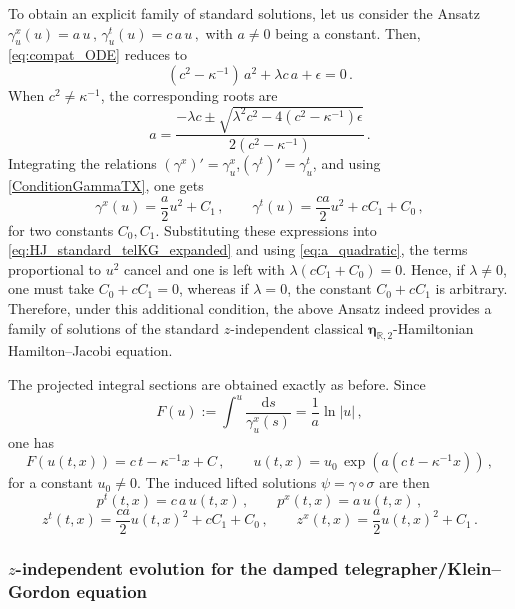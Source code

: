 \documentclass[11pt,twoside]{article}
\theoremstyle{plain}
\theoremstyle{definition}
\theoremstyle{remark}
\renewcommand{\d}{\mathrm{d}}
\begin{document}
To obtain an explicit family of standard solutions, let us consider the Ansatz
\(
\gamma_u^x(u)=a\,u\,,\, \gamma_u^t(u)=c\,a\,u\,,
\)
with \(a\neq0\) being a constant. Then, \eqref{eq:compat_ODE} reduces to
\begin{equation}\label{eq:a_quadratic}
(c^2-\kappa^{-1})\,a^2+\lambda c\,a+\epsilon=0\,.
\end{equation}
When \(c^2\neq \kappa^{-1}\), the corresponding roots are
\[
a=\frac{-\lambda c\pm\sqrt{\lambda^2 c^2-4(c^2-\kappa^{-1})\epsilon}}{2(c^2-\kappa^{-1})}\,.
\]
Integrating the relations $(\gamma^x)'=\gamma_u^x$,$(\gamma^t)'=\gamma_u^t$, and using \eqref{ConditionGammaTX}, one gets
\[
\gamma^x(u)=\frac{a}{2}u^2+C_1\,,\qquad
\gamma^t(u)=\frac{ca}{2}u^2+cC_1+C_0\,,
\]
for two constants $C_0,C_1$.
Substituting these expressions into \eqref{eq:HJ_standard_telKG_expanded} and using \eqref{eq:a_quadratic}, the terms proportional to \(u^2\) cancel and one is left with
\(
\lambda (cC_1+C_0)=0
\).
Hence, if \(\lambda\neq0\), one must take \(C_0+cC_1=0\), whereas if \(\lambda=0\), the constant \(C_0+cC_1\) is arbitrary. Therefore, under this additional condition, the above Ansatz indeed provides a family of solutions of the standard \(z\)-independent classical ${\bm \eta}_{\mathbb{R},2}$-Hamiltonian Hamilton--Jacobi equation.

The projected integral sections are obtained exactly as before. Since
\[
F(u):=\int^u\frac{\d s}{\gamma_u^x(s)}=\frac1a\ln|u|\,,
\]
one has
\[
F(u(t,x))=c\,t-\kappa^{-1}x+C\,,
\qquad
u(t,x)=u_0\,\exp\!\left(a(c\,t-\kappa^{-1}x)\right)\,,
\]
for a constant \(u_0\neq0\). The induced lifted solutions \(\psi=\gamma\circ\sigma\) are then
\[
p^t(t,x)=c\,a\,u(t,x)\,,\qquad p^x(t,x)=a\,u(t,x)\,,
\]
\[
z^t(t,x)=\frac{ca}{2}u(t,x)^2+cC_1+C_0\,,\qquad
z^x(t,x)=\frac{a}{2}u(t,x)^2+C_1\,.
\]

\subsubsection{$z$-independent evolution for the damped telegrapher/Klein--Gordon equation}
\end{document}
